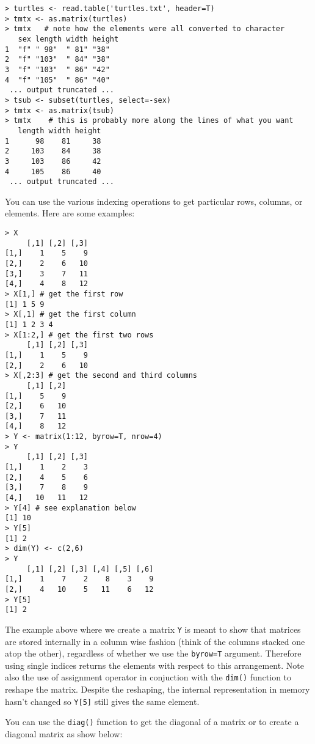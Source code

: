 \documentclass{article}
\begin{document}
\begin{lstlisting}
> turtles <- read.table('turtles.txt', header=T)
> tmtx <- as.matrix(turtles) 
> tmtx   # note how the elements were all converted to character 
   sex length width height
1  "f" " 98"  " 81" "38"  
2  "f" "103"  " 84" "38"  
3  "f" "103"  " 86" "42"  
4  "f" "105"  " 86" "40"  
 ... output truncated ...
> tsub <- subset(turtles, select=-sex)
> tmtx <- as.matrix(tsub)
> tmtx    # this is probably more along the lines of what you want
   length width height
1      98    81     38
2     103    84     38
3     103    86     42
4     105    86     40
 ... output truncated ...
\end{lstlisting}
You can use the various indexing operations to get particular rows,
columns, or elements. Here are some examples:

\begin{lstlisting}
> X
     [,1] [,2] [,3]
[1,]    1    5    9
[2,]    2    6   10
[3,]    3    7   11
[4,]    4    8   12
> X[1,] # get the first row
[1] 1 5 9
> X[,1] # get the first column
[1] 1 2 3 4
> X[1:2,] # get the first two rows
     [,1] [,2] [,3]
[1,]    1    5    9
[2,]    2    6   10
> X[,2:3] # get the second and third columns
     [,1] [,2]
[1,]    5    9
[2,]    6   10
[3,]    7   11
[4,]    8   12
> Y <- matrix(1:12, byrow=T, nrow=4)
> Y
     [,1] [,2] [,3]
[1,]    1    2    3
[2,]    4    5    6
[3,]    7    8    9
[4,]   10   11   12
> Y[4] # see explanation below
[1] 10 
> Y[5]
[1] 2
> dim(Y) <- c(2,6)
> Y
     [,1] [,2] [,3] [,4] [,5] [,6]
[1,]    1    7    2    8    3    9
[2,]    4   10    5   11    6   12
> Y[5]
[1] 2
\end{lstlisting}
The example above where we create a matrix \lstinline!Y! is meant to
show that matrices are stored internally in a column wise fashion (think
of the columns stacked one atop the other), regardless of whether we use
the \lstinline!byrow=T! argument. Therefore using single indices returns
the elements with respect to this arrangement. Note also the use of
assignment operator in conjuction with the \lstinline!dim()! function to
reshape the matrix. Despite the reshaping, the internal representation
in memory hasn't changed so \lstinline!Y[5]! still gives the same
element.

You can use the \lstinline!diag()! function to get the diagonal of a
matrix or to create a diagonal matrix as show below:
\end{document}
